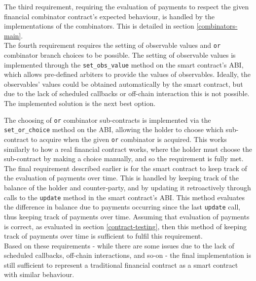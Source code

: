 The third requirement, requiring the evaluation of payments to respect the given financial combinator contract's expected behaviour, is handled by the implementations of the combinators. This is detailed in section \ref{combinators-main}. \\

The fourth requirement requires the setting of observable values and \texttt{or} combinator branch choices to be possible. The setting of observable values is implemented through the \texttt{set\_obs\_value} method on the smart contract's ABI, which allows pre-defined arbiters to provide the values of observables. Ideally, the observables' values could be obtained automatically by the smart contract, but due to the lack of scheduled callbacks or off-chain interaction this is not possible. The implemented solution is the next best option.

The choosing of \texttt{or} combinator sub-contracts is implemented via the \texttt{set\_or\_choice} method on the ABI, allowing the holder to choose which sub-contract to acquire when the given \texttt{or} combinator is acquired. This works similarly to how a real financial contract works, where the holder must choose the sub-contract by making a choice manually, and so the requirement is fully met. \\

The final requirement described earlier is for the smart contract to keep track of the evaluation of payments over time. This is handled by keeping track of the balance of the holder and counter-party, and by updating it retroactively through calls to the \texttt{update} method in the smart contract's ABI. This method evaluates the difference in balance due to payments occurring since the last \texttt{update} call, thus keeping track of payments over time. Assuming that evaluation of payments is correct, as evaluated in section \ref{contract-testing}, then this method of keeping track of payments over time is sufficient to fulfil this requirement. \\

Based on these requirements - while there are some issues due to the lack of scheduled callbacks, off-chain interactions, and so-on - the final implementation is still sufficient to represent a traditional financial contract as a smart contract with similar behaviour. \\


